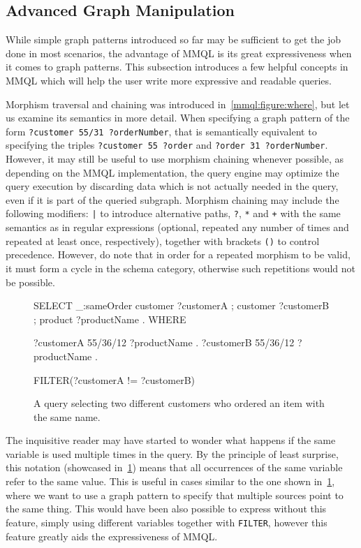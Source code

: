 \subsection{Advanced Graph Manipulation}

While simple graph patterns introduced so far may be sufficient to get the job done in most scenarios, the advantage of MMQL is its great expressiveness when it comes to graph patterns.
This subsection introduces a few helpful concepts in MMQL which will help the user write more expressive and readable queries.

Morphism traversal and chaining was introduced in~\cref{mmql:figure:where}, but let us examine its semantics in more detail.
When specifying a graph pattern of the form \texttt{?customer 55/31 ?orderNumber}, that is semantically equivalent to specifying the triples \texttt{?customer 55 ?order} and \texttt{?order 31 ?orderNumber}.
However, it may still be useful to use morphism chaining whenever possible, as depending on the MMQL implementation, the query engine may optimize the query execution by discarding data which is not actually needed in the query, even if it is part of the queried subgraph.
Morphism chaining may include the following modifiers: \texttt{|} to introduce alternative paths, \texttt{?}, \texttt{*} and \texttt{+} with the same semantics as in regular expressions (optional, repeated any number of times and repeated at least once, respectively), together with brackets \texttt{()} to control precedence.
However, do note that in order for a repeated morphism to be valid, it must form a cycle in the schema category, otherwise such repetitions would not be possible.

\begin{figure}[ht]
\begin{code}
SELECT {
    _:sameOrder customer ?customerA ;
        customer ?customerB ;
        product ?productName .
}
WHERE {
    ?customerA 55/36/12 ?productName .
    ?customerB 55/36/12 ?productName .
    
    FILTER(?customerA != ?customerB)
}
\end{code}
\caption{A query selecting two different customers who ordered an item with the same name.}\label{mmql:figure:samevar}
\end{figure}

The inquisitive reader may have started to wonder what happens if the same variable is used multiple times in the query.
By the principle of least surprise, this notation (showcased in~\cref{mmql:figure:samevar}) means that all occurrences of the same variable refer to the same value.
This is useful in cases similar to the one shown in~\cref{mmql:figure:samevar}, where we want to use a graph pattern to specify that multiple sources point to the same thing.
This would have been also possible to express without this feature, simply using different variables together with \texttt{FILTER}, however this feature greatly aids the expressiveness of MMQL.

